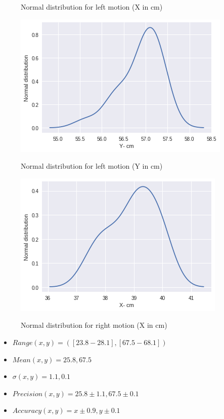 \documentclass[11pt,a4paper]{article}
\begin{document}
\begin{itemize}
\begin{figure}[H]
			\label{fig:straightG}
			\caption{Normal distribution for left motion (X in cm)}
		\end{figure}
		\begin{figure}[H]
			\centering	
			\includegraphics[width=0.8\linewidth]{old_leftmotion_kdeplot_Y}
			\label{fig:straightG}
			\caption{Normal distribution for left motion (Y in cm)}
		\end{figure}
		\begin{figure}[H]
			\centering	
			\includegraphics[width=0.8\linewidth]{old_rightmotion_kdeplot_X}
			\label{fig:straightG}
			\caption{Normal distribution for right motion (X in cm)}
		\end{figure}
		
		\begin{itemize}
			\item $ Range (x,y) =([23.8-28.1],[67.5-68.1]) $
			\item $ Mean (x, y) = 25.8,67.5$
			\item $ \sigma (x, y)= 1.1, 0.1 $
			\item $ Precision (x, y)= 25.8 \pm 1.1, 67.5 \pm 0.1  $
			\item $ Accuracy (x,y) = x \pm0.9  , y \pm0.1 $  
		\end{itemize}
		

\end{itemize}
\end{document}
